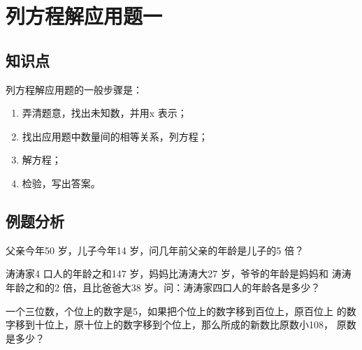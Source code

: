 \chapter{列方程解应用题一}
\section{知识点}
列方程解应用题的一般步骤是：
\begin{enumerate}
    \item 弄清题意，找出未知数，并用x 表示；
    \item 找出应用题中数量间的相等关系，列方程；
    \item 解方程；
    \item 检验，写出答案。
\end{enumerate}
\vspace{-1cm}
\section{例题分析}
\begin{example}
    父亲今年50 岁，儿子今年14 岁，问几年前父亲的年龄是儿子的5 倍？
\end{example}
\vspace{3cm}
\begin{example}
    涛涛家4 口人的年龄之和147 岁，妈妈比涛涛大27 岁，爷爷的年龄是妈妈和
涛涛年龄之和的2 倍，且比爸爸大38 岁。问：涛涛家四口人的年龄各是多少？
\end{example}
\vspace{3cm}
\begin{example}
    一个三位数，个位上的数字是5，如果把个位上的数字移到百位上，原百位上
的数字移到十位上，原十位上的数字移到个位上，那么所成的新数比原数小108，
原数是多少？
\end{example}
\vspace{3cm}
